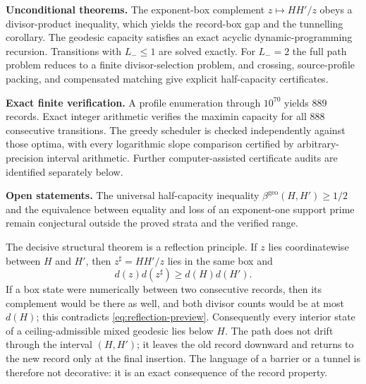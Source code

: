 \documentclass[11pt]{article}
\numberwithin{equation}{section}
\theoremstyle{blueplain}
\theoremstyle{bluedef}
\newcommand{\betageo}{\beta^{\mathrm{geo}}}
\begin{document}
\begin{tcolorbox}[colback=softgray,colframe=deepblue!70,boxrule=0.7pt,arc=1.2mm,left=1.2mm,right=1.2mm,top=1.0mm,bottom=1.0mm]
\small
\textbf{Unconditional theorems.}
The exponent-box complement $z\mapsto HH'/z$ obeys a divisor-product inequality, which yields the record-box gap and the tunnelling corollary.  The geodesic capacity satisfies an exact acyclic dynamic-programming recursion.  Transitions with $L_-\le1$ are solved exactly.  For $L_-=2$ the full path problem reduces to a finite divisor-selection problem, and crossing, source-profile packing, and compensated matching give explicit half-capacity certificates.

\medskip
\textbf{Exact finite verification.}
A profile enumeration through $10^{70}$ yields $889$ records.  Exact integer arithmetic verifies the maximin capacity for all $888$ consecutive transitions.  The greedy scheduler is checked independently against those optima, with every logarithmic slope comparison certified by arbitrary-precision interval arithmetic.  Further computer-assisted certificate audits are identified separately below.

\medskip
\textbf{Open statements.}
The universal half-capacity inequality $\betageo(H,H')\ge1/2$ and the equivalence between equality and loss of an exponent-one support prime remain conjectural outside the proved strata and the verified range.
\end{tcolorbox}

The decisive structural theorem is a reflection principle.  If $z$ lies coordinatewise between $H$ and $H'$, then $z^\sharp=HH'/z$ lies in the same box and
\begin{equation}
 d(z)d(z^\sharp)\ge d(H)d(H').
 \label{eq:reflection-preview}
\end{equation}
If a box state were numerically between two consecutive records, then its complement would be there as well, and both divisor counts would be at most $d(H)$; this contradicts \eqref{eq:reflection-preview}.  Consequently every interior state of a ceiling-admissible mixed geodesic lies below $H$.  The path does not drift through the interval $(H,H')$; it leaves the old record downward and returns to the new record only at the final insertion.  The language of a barrier or a tunnel is therefore not decorative: it is an exact consequence of the record property.
\end{document}
